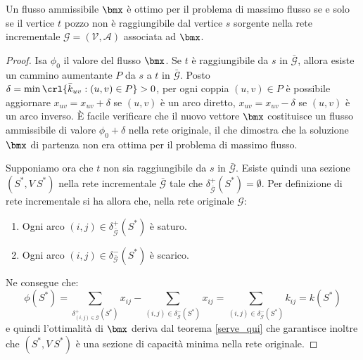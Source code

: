 \documentclass[\main/main.tex]{subfiles}
\begin{document}
\begin{theorem}
  Un flusso ammissibile $\bmx$ è ottimo per il problema di massimo flusso se e solo se il vertice $t$ pozzo non è raggiungibile dal vertice $s$ sorgente nella rete incrementale $\mathcal{G} = (\mathcal{V}, \mathcal{A})$ associata ad $\bmx$.
\end{theorem}

\begin{proof}
  Isa $\phi_0$ il valore del flusso $\bmx$. Se $t$ è raggiungibile da $s$ in $\bar{\mathcal{G}}$, allora esiste un cammino aumentante $P$ da $s$ a $t$ in $\bar{\mathcal{G}}$. Posto $\delta = \min\crl{\bar{k}_{uv}:(u,v) \in P}>0$, per ogni coppia $(u,v) \in P$ è possibile aggiornare $x_{uv}=x_{uv}+\delta$ se $(u,v)$ è un arco diretto, $x_{uv}=x_{uv}-\delta$ se $(u,v)$ è un arco inverso. È facile verificare che il nuovo vettore $\bmx$ costituisce un flusso ammissibile di valore $\phi_0 + \delta$ nella rete originale, il che dimostra che la soluzione $\bmx$ di partenza non era ottima per il problema di massimo flusso.

  Supponiamo ora che $t$ non sia raggiungibile da $s$ in $\bar{\mathcal{G}}$. Esiste quindi una sezione $(S^*,V\ S^*)$ nella rete incrementale $\bar{\mathcal{G}}$ tale che $\delta_{\bar{\mathcal{G}}}^{+}(S^*) = \emptyset$. Per definizione di rete incrementale si ha allora che, nella rete originale $\mathcal{G}$:
  \begin{enumerate}
    \item Ogni arco $(i,j) \in \delta_{\bar{\mathcal{G}}}^{+}(S^*)$ è saturo.
    \item Ogni arco $(i,j) \in \delta_{\bar{\mathcal{G}}}^{-}(S^*)$ è scarico.
  \end{enumerate}
  Ne consegue che:
  \[
    \phi(S^*) = \sum_{\delta_{(i,j) \in \bar{\mathcal{G}}}^{+}(S^*)} x_{ij} - \sum_{(i,j) \in \delta_{\bar{\mathcal{G}}}^{-}(S^*)} x_{ij} = \sum_{(i,j) \in \delta_{\bar{\mathcal{G}}}^{-}(S^*)} k_{ij} = k(S^*)
  \]
  e quindi l'ottimalità di $\bmx$ deriva dal teorema \ref{serve_qui} che garantisce inoltre che $(S^*, V\ S^*)$ è una sezione di capacità minima nella rete originale.
\end{proof}
\end{document}
